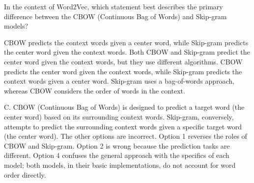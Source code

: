 \documentclass[11pt,addpoints,answers]{exam}
\begin{document}
\begin{questions}
\question[1] In the context of Word2Vec, which statement best describes the primary difference between the CBOW (Continuous Bag of Words) and Skip-gram models?
  \begin{choices}
    \choice CBOW predicts the context words given a center word, while Skip-gram predicts the center word given the context words.
    \choice Both CBOW and Skip-gram predict the center word given the context words, but they use different algorithms.
    \choice CBOW predicts the center word given the context words, while Skip-gram predicts the context words given a center word.
    \choice Skip-gram uses a bag-of-words approach, whereas CBOW considers the order of words in the context.
  \end{choices}
\begin{solution}
C.  CBOW (Continuous Bag of Words) is designed to predict a target word (the center word) based on its surrounding context words. Skip-gram, conversely, attempts to predict the surrounding context words given a specific target word (the center word). The other options are incorrect. Option 1 reverses the roles of CBOW and Skip-gram. Option 2 is wrong because the prediction tasks are different. Option 4 confuses the general approach with the specifics of each model; both models, in their basic implementations, do not account for word order directly.
\end{solution}



\end{questions}
\end{document}
